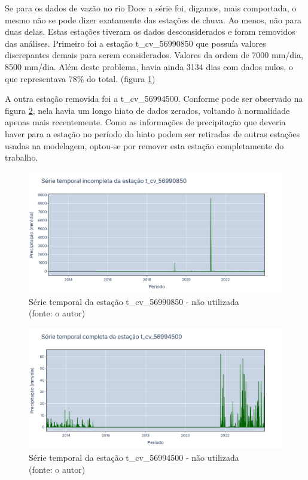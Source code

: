 Se para os dados de vazão no rio Doce a série foi, digamos, mais comportada, o mesmo não se pode dizer exatamente das estações de chuva. Ao menos, não para duas delas. Estas estações tiveram os dados desconsiderados e foram removidos das análises. Primeiro foi a estação t\_cv\_56990850 que possuía valores discrepantes demais para serem considerados. Valores da ordem de 7000 mm/dia, 8500 mm/dia. Além deste problema, havia ainda 3134 dias com dados nulos, o que representava 78\% do total. (figura \ref{fig:doceSerieIncompleta_t_cv_56990850})

A outra estação removida foi a t\_cv\_56994500. Conforme pode ser observado na figura \ref{fig:doceSerieCompleta_t_cv_56994500}, nela havia um longo hiato de dados zerados, voltando à normalidade apenas mais recentemente. Como as informações de precipitação que deveria haver para a estação no período do hiato podem ser retiradas de outras estações usadas na modelagem, optou-se por remover esta estação completamente do trabalho.

\begin{figure}[!h]
	\centering
	\includegraphics[scale=0.25]{Figuras/rio_doce/doceSerieIncompleta_t_cv_56990850.png}
	\caption{Série temporal da estação t\_cv\_56990850 - não utilizada\\(fonte: o autor)}
	\label{fig:doceSerieIncompleta_t_cv_56990850}
\end{figure}

\begin{figure}[!h]
	\centering
	\includegraphics[scale=0.25]{Figuras/rio_doce/doceSerieCompleta_t_cv_56994500.png}
	\caption{Série temporal da estação t\_cv\_56994500 - não utilizada\\(fonte: o autor)}
	\label{fig:doceSerieCompleta_t_cv_56994500}
\end{figure}


